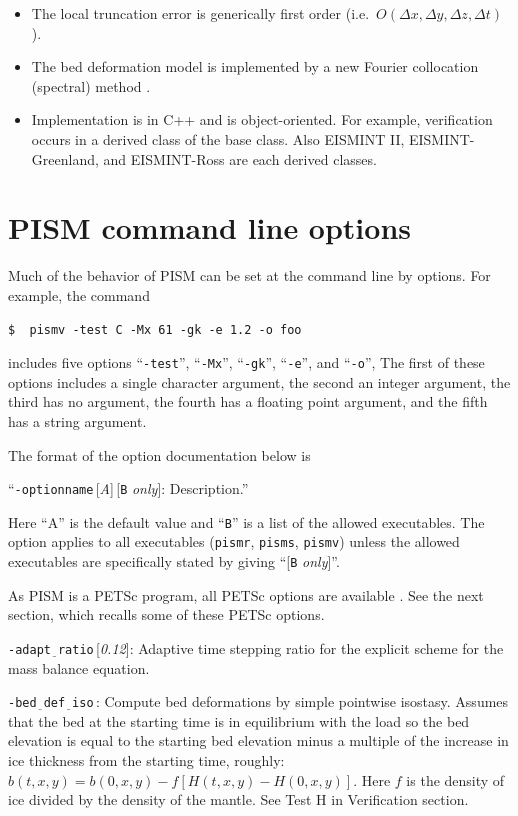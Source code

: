 \documentclass[11pt,final]{amsart}
\renewcommand{\t}[1]{\texttt{#1}}
\newcommand{\rawopt}[1]{\vspace{1mm}\noindent \large\texttt{-#1}\normalsize}
\newcommand{\opt}[1]{\rawopt{#1}\,:\quad}
\newcommand{\optdef}[2]{\rawopt{#1}\,[\textsl{#2}]:\quad}
\newcommand{\optdefrestrict}[3]{\rawopt{#1}\,[\textsl{#2}]\,[\texttt{#3} \textsl{only}]:\quad}
\newcommand{\und}{$\underline{\,\,\,}$}
\begin{document}
\begin{itemize}
\item The local truncation error is generically first order (i.e.~$O(\Delta x,\Delta y,\Delta z,\Delta t)$).
\item The bed deformation model is implemented by a new Fourier collocation (spectral) method \cite{BLKfastearth}.
\item Implementation is in C++ and is object-oriented.  For example, verification occurs in a derived class of the base class.  Also EISMINT II, EISMINT-Greenland, and EISMINT-Ross are each derived classes.
\end{itemize}


\clearpage\newpage



\appendix

\clearpage\newpage
\section{PISM command line options}\label{sect:options}

Much of the behavior of PISM can be set at the command line by options.  For example, the command 

\verb|$  pismv -test C -Mx 61 -gk -e 1.2 -o foo|

\noindent includes five options ``\verb|-test|'', ``\verb|-Mx|'', ``\verb|-gk|'', ``\verb|-e|'', and ``\verb|-o|'',  The first of these options includes a single character argument, the second an integer argument, the third has no argument, the fourth has a floating point argument, and the fifth has a string argument.

The format of the option documentation below is

\centerline{``\optdefrestrict{optionname}{A}{B} Description.''}

\noindent Here ``A'' is the default value and ``\t{B}'' is a list of the allowed executables.  The option applies to all executables (\verb|pismr|, \verb|pisms|, \verb|pismv|) unless the allowed executables are specifically stated by giving ``[\t{B} \textsl{only}]''.

As PISM is a PETSc program, all PETSc options are available \cite{petsc-user-ref}.  See the next section, which recalls some of these PETSc options.
\bigskip

\optdef{adapt\und ratio}{0.12}  Adaptive time stepping ratio for the explicit scheme for the mass balance equation.

\opt{bed\und def\und iso} Compute bed deformations by simple pointwise isostasy.  Assumes that the bed at the starting time is in equilibrium with the load so the bed elevation is equal to the starting bed elevation minus a multiple of the increase in ice thickness from the starting time, roughly: $b(t,x,y) = b(0,x,y) - f [H(t,x,y) - H(0,x,y)]$.  Here $f$ is the density of ice divided by the density of the mantle.  See Test H in Verification section.
\end{document}
